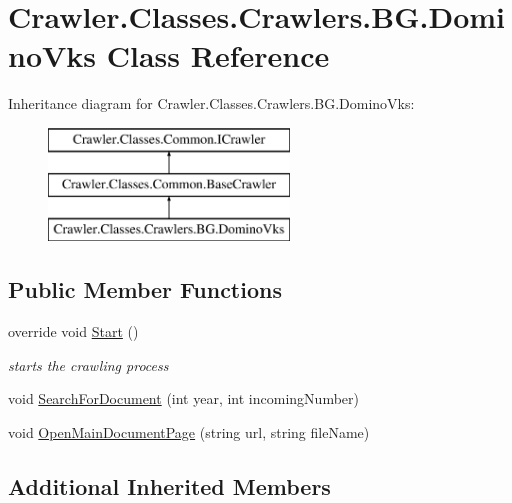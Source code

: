 \hypertarget{class_crawler_1_1_classes_1_1_crawlers_1_1_b_g_1_1_domino_vks}{\section{Crawler.\-Classes.\-Crawlers.\-B\-G.\-Domino\-Vks Class Reference}
\label{class_crawler_1_1_classes_1_1_crawlers_1_1_b_g_1_1_domino_vks}
}
Inheritance diagram for Crawler.\-Classes.\-Crawlers.\-B\-G.\-Domino\-Vks\-:\begin{figure}[H]
\begin{center}
\leavevmode
\includegraphics[height=3.000000cm]{class_crawler_1_1_classes_1_1_crawlers_1_1_b_g_1_1_domino_vks}
\end{center}
\end{figure}
\subsection*{Public Member Functions}
\begin{DoxyCompactItemize}
\item 
override void \hyperlink{class_crawler_1_1_classes_1_1_crawlers_1_1_b_g_1_1_domino_vks_a0de93e8fa14dd68a0698b5e8530e2592}{Start} ()
\begin{DoxyCompactList}\small\item\em starts the crawling process \end{DoxyCompactList}\item 
void \hyperlink{class_crawler_1_1_classes_1_1_crawlers_1_1_b_g_1_1_domino_vks_af8441022e752ecdf8c8846b24554088a}{Search\-For\-Document} (int year, int incoming\-Number)
\item 
void \hyperlink{class_crawler_1_1_classes_1_1_crawlers_1_1_b_g_1_1_domino_vks_a414223a1445659affa79eedd5535b36b}{Open\-Main\-Document\-Page} (string url, string file\-Name)
\end{DoxyCompactItemize}
\subsection*{Additional Inherited Members}


